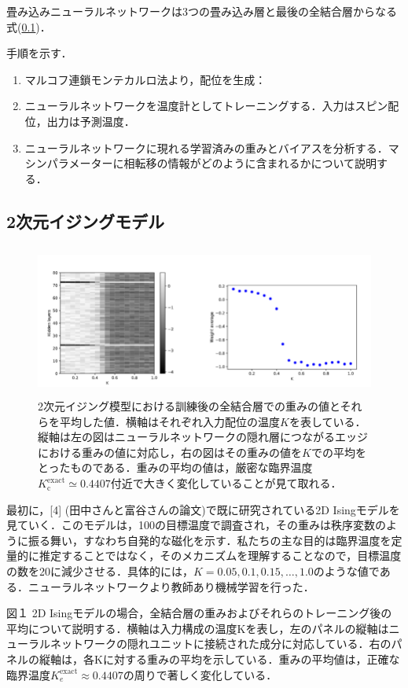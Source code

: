 \documentclass[a4paper,11pt]{jsarticle}
\begin{document}
畳み込みニューラルネットワークは3つの畳み込み層と最後の全結合層からなる式(\ref{})．\par
手順を示す．
\begin{enumerate}
  \item マルコフ連鎖モンテカルロ法より，配位を生成：
  \item ニューラルネットワークを温度計としてトレーニングする．入力はスピン配位，出力は予測温度．
  \item ニューラルネットワークに現れる学習済みの重みとバイアスを分析する．マシンパラメーターに相転移の情報がどのように含まれるかについて説明する．
\end{enumerate}

\subsection{2次元イジングモデル}
\begin{figure}[hb]
  \begin{center}
    \includegraphics[height=5cm]{image/Figure1.png}
    \caption{2次元イジング模型における訓練後の全結合層での重みの値とそれらを平均した値．横軸はそれぞれ入力配位の温度$K$を表している．縦軸は左の図はニューラルネットワークの隠れ層につながるエッジにおける重みの値に対応し，右の図はその重みの値を$K$での平均をとったものである．重みの平均の値は，厳密な臨界温度$K_{\text{c}}^{\text{exact}}\simeq 0.4407$付近で大きく変化していることが見て取れる．}
  \end{center}
\end{figure}
最初に，[4] (田中さんと富谷さんの論文)で既に研究されている2D Isingモデルを見ていく．このモデルは，100の目標温度で調査され，その重みは秩序変数のように振る舞い，すなわち自発的な磁化を示す．私たちの主な目的は臨界温度を定量的に推定することではなく，そのメカニズムを理解することなので，目標温度の数を20に減少させる．具体的には，$K = 0.05, 0.1, 0.15, \dots, 1.0$のような値である．ニューラルネットワークより教師あり機械学習を行った．

図１
2D Isingモデルの場合，全結合層の重みおよびそれらのトレーニング後の平均について説明する．横軸は入力構成の温度Kを表し，左のパネルの縦軸はニューラルネットワークの隠れユニットに接続された成分に対応している．右のパネルの縦軸は，各Kに対する重みの平均を示している．重みの平均値は，正確な臨界温度$K_e^{\text{exact}} \approx 0.4407$の周りで著しく変化している．
\end{document}
